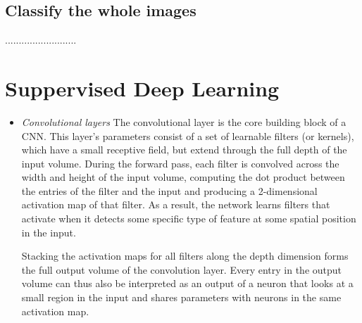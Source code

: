 \documentclass[hidelinks,12pt,a4paper]{report}
\begin{document}
\subsection{Classify the whole images}
..........................
\section{Suppervised Deep Learning}

\begin{itemize}
\item \textit{Convolutional layers}
The convolutional layer is the core building block of a CNN. This layer's parameters consist of a set of learnable filters (or kernels), which have a small receptive field, but extend through the full depth of the input volume. During the forward pass, each filter is convolved across the width and height of the input volume, computing the dot product between the entries of the filter and the input and producing a 2-dimensional activation map of that filter. As a result, the network learns filters that activate when it detects some specific type of feature at some spatial position in the input.

Stacking the activation maps for all filters along the depth dimension forms the full output volume of the convolution layer. Every entry in the output volume can thus also be interpreted as an output of a neuron that looks at a small region in the input and shares parameters with neurons in the same activation map.


\end{itemize}
\end{document}
